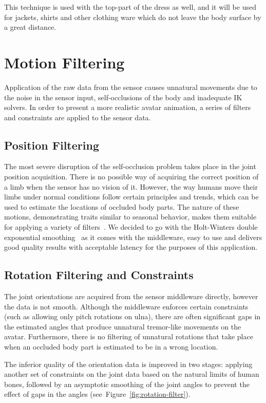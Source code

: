 This technique is used with the top-part of the dress as well, and it will be used for jackets, shirts and other clothing ware which do not leave the body surface by a great distance. 


\section{Motion Filtering}
\label{section2_3}

Application of the raw data from the sensor causes unnatural movements due to the noise in the sensor input, self-occlusions of the body and inadequate IK solvers.  In order to present a more realistic avatar animation, a series of filters and constraints are applied to the sensor data. 

\subsection{Position Filtering}
The most severe disruption of the self-occlusion problem takes place in the joint position acquisition. There is no possible way of acquiring the correct position of a limb when the sensor has no vision of it. However, the way humans move their limbs under normal conditions follow certain principles and trends, which can be used to estimate the locations of occluded body parts. The nature of these motions, demonstrating traits similar to seasonal behavior, makes them suitable for applying a variety of filters~\cite{Azimi2012}. We decided to go with the Holt-Winters double exponential smoothing~\cite{Holt2004,Kalekar2004} as it comes with the middleware, easy to use and delivers good quality results with acceptable latency for the purposes of this application. 

\subsection{Rotation Filtering and Constraints}
The joint orientations are acquired from the sensor middleware directly, however the data is not smooth. Although the middleware enforces certain constraints (such as allowing only pitch rotations on ulna), there are often significant gaps in the estimated angles that produce unnatural tremor-like movements on the avatar. Furthermore, there is no filtering of unnatural rotations that take place when an occluded body part is estimated to be in a wrong location. 

The inferior quality of the orientation data is improved in two stages: applying another set of constraints on the joint data based on the natural limits of human bones, followed by an asymptotic smoothing of the joint angles to prevent the effect of gaps in the angles (see~Figure~\ref{fig:rotation-filter}). 

